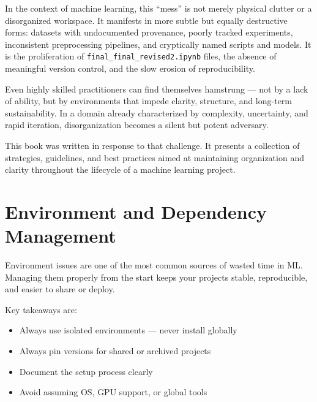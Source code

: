 \documentclass[12pt,openany]{book}
\begin{document}
In the context of machine learning, this “mess” is not merely physical clutter or a disorganized workspace. It manifests in more subtle but equally destructive forms: datasets with undocumented provenance, poorly tracked experiments, inconsistent preprocessing pipelines, and cryptically named scripts and models. It is the proliferation of \texttt{final\_final\_revised2.ipynb} files, the absence of meaningful version control, and the slow erosion of reproducibility. \newline

Even highly skilled practitioners can find themselves hamstrung — not by a lack of ability, but by environments that impede clarity, structure, and long-term sustainability. In a domain already characterized by complexity, uncertainty, and rapid iteration, disorganization becomes a silent but potent adversary. \newline

This book was written in response to that challenge. It presents a collection of strategies, guidelines, and best practices aimed at maintaining organization and clarity throughout the lifecycle of a machine learning project. 







\setcounter{tocdepth}{1}

\tableofcontents

\newpage




\chapter{Environment and Dependency Management}

Environment issues are one of the most common sources of wasted time in ML. Managing them properly from the start keeps your projects stable, reproducible, and easier to share or deploy. \newline


Key takeaways are:
\begin{itemize}
    \item Always use isolated environments — never install globally
    \item Always pin versions for shared or archived projects
    \item Document the setup process clearly
    \item Avoid assuming OS, GPU support, or global tools
\end{itemize}
\end{document}
